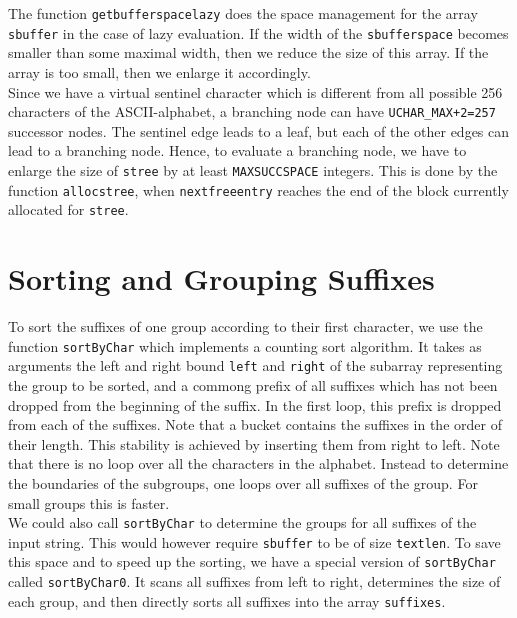 \documentclass[a4paper]{article}
\begin{document}
The function \texttt{getbufferspacelazy} does the space management for the
array \texttt{sbuffer} in the case of lazy evaluation. If the width of the
\texttt{sbufferspace} becomes smaller than some maximal width, then we reduce
the size of this array. If the array is too small, then we enlarge it
accordingly.\\


Since we have a virtual sentinel character which is different from all possible
256 characters of the ASCII-alphabet, a branching node can have
\texttt{UCHAR\_MAX+2=257} successor nodes. The sentinel edge leads to a leaf,
but each of the other edges can lead to a branching node. Hence, to evaluate a
branching node, we have to enlarge the size of \texttt{stree} by at least
\texttt{MAXSUCCSPACE} integers. This is done by the function
\texttt{allocstree}, when \texttt{nextfreeentry} reaches the end of the
block currently allocated for \texttt{stree}.


\section{Sorting and Grouping Suffixes}

To sort the suffixes of one group according to their first character,
we use the function \texttt{sortByChar} which implements a counting sort
algorithm. It takes as arguments the left and right bound \texttt{left} and
\texttt{right} of the subarray representing the group to be sorted, and
a commong prefix of all suffixes which has not been dropped from the
beginning of the suffix. In the first loop, this prefix is dropped
from each of the suffixes. Note that a bucket contains the suffixes
in the order of their length. This stability is achieved by inserting
them from right to left. Note that there is no loop over all the
characters in the alphabet. Instead to determine the boundaries
of the subgroups, one loops over all suffixes of the group. For small
groups this is faster.\\


We could also call \texttt{sortByChar} to determine the groups for all suffixes
of the input string. This would however require \texttt{sbuffer} to be of size
\texttt{textlen}. To save this space and to speed up the sorting, we have a
special version of \texttt{sortByChar} called \texttt{sortByChar0}. It scans
all suffixes from left to right, determines the size of each group, and then
directly sorts all suffixes into the array \texttt{suffixes}.\\
\end{document}
